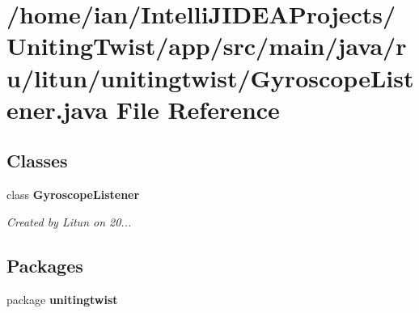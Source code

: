 \section{/home/ian/\+Intelli\+J\+I\+D\+E\+A\+Projects/\+Uniting\+Twist/app/src/main/java/ru/litun/unitingtwist/\+Gyroscope\+Listener.java File Reference}
\label{_gyroscope_listener_8java}
\subsection*{Classes}
\begin{DoxyCompactItemize}
\item 
class \textbf{ Gyroscope\+Listener}
\begin{DoxyCompactList}\small\item\em Created by Litun on 20... \end{DoxyCompactList}\end{DoxyCompactItemize}
\subsection*{Packages}
\begin{DoxyCompactItemize}
\item 
package \textbf{ unitingtwist}
\end{DoxyCompactItemize}
